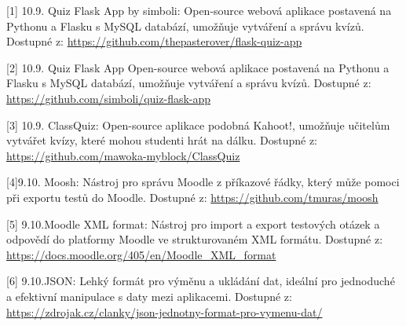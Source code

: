 \documentclass[12pt, a4paper, twoside, openright]{report}
\begin{document}
[1] 10.9. Quiz Flask App by simboli: Open-source webová aplikace postavená na Pythonu a Flasku s MySQL databází, umožňuje vytváření a správu kvízů. Dostupné z: \url{https://github.com/thepasterover/flask-quiz-app}

[2] 10.9. Quiz Flask App Open-source webová aplikace postavená na Pythonu a Flasku s MySQL databází, umožňuje vytváření a správu kvízů. Dostupné z: \url{https://github.com/simboli/quiz-flask-app}

[3] 10.9. ClassQuiz: Open-source aplikace podobná Kahoot!, umožňuje učitelům vytvářet kvízy, které mohou studenti hrát na dálku. 
 Dostupné z: \url{https://github.com/mawoka-myblock/ClassQuiz}

[4]9.10. Moosh: Nástroj pro správu Moodle z příkazové řádky, který může pomoci při exportu testů do Moodle. Dostupné z: \url{https://github.com/tmuras/moosh}

[5] 9.10.Moodle XML format: Nástroj pro import a export testových otázek a odpovědí do platformy Moodle ve strukturovaném XML formátu. Dostupné z: \url{https://docs.moodle.org/405/en/Moodle_XML_format}

[6] 9.10.JSON: Lehký formát pro výměnu a ukládání dat, ideální pro jednoduché a efektivní manipulace s daty mezi aplikacemi. Dostupné z: \url{https://zdrojak.cz/clanky/json-jednotny-format-pro-vymenu-dat/}
\end{document}

